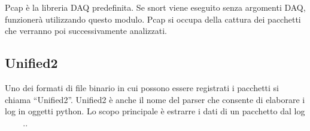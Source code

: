 Pcap è la libreria DAQ predefinita. Se snort viene eseguito senza argomenti DAQ, funzionerà utilizzando questo modulo. Pcap si occupa della cattura dei pacchetti che verranno poi successivamente analizzati.

\subsection{Unified2}

Uno dei formati di file binario in cui possono essere registrati i pacchetti si chiama ``Unified2''. Unified2 è anche il nome del parser che consente di elaborare i log in oggetti python. Lo scopo principale è estrarre i dati di un pacchetto dal log ~\cite{Snort:2020} ~\cite{manual-snort} ~\cite{manual-snort}..

